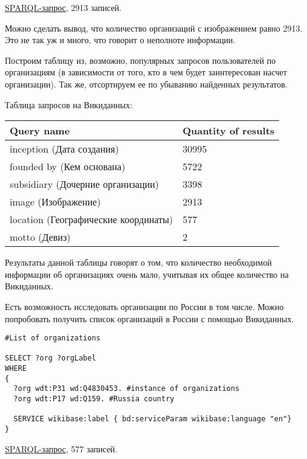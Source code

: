 \href{https://query.wikidata.org/#%23List%20of%20organisations%20%0A%0ASELECT%20%3Forg%20%3ForgLabel%20%3Fimage%0AWHERE%0A%7B%0A%20%20%3Forg%20wdt%3AP31%20wd%3AQ4830453.%20%23instance%20of%20orgs%0A%20%20%3Forg%20wdt%3AP18%20%3Fimage%0A%20%20%0A%0A%20%20SERVICE%20wikibase%3Alabel%20%7B%20bd%3AserviceParam%20wikibase%3Alanguage%20%22en%22%7D%0A%7D}{SPARQL-запрос}, 2913 записей.

Можно сделать вывод, что количество организаций с изображением равно 2913. Это не так уж и много, что говорит о неполноте информации.

Построим таблицу из, возможно, популярных запросов пользователей по организациям (в зависимости от того, кто в чем будет заинтересован насчет организации). Так же, отсортируем ее по убыванию найденных результатов.

Таблица запросов на Викиданных:\\
\begin{tabular}{|l|l|}
\hline
\textbf{Query name} & \textbf{Quantity of results} \\
\hline
inception (Дата создания) & 30995 \\	
\hline
founded by (Кем основана) & 5722 \\
\hline
subsidiary (Дочерние организации) & 3398 \\
\hline
image (Изображение) & 2913 \\
\hline
location (Географические координаты) & 577 \\
\hline
motto (Девиз) & 2 \\
\hline
\end{tabular}

Результаты данной таблицы говорят о том, что количество необходимой информации об организациях очень мало, учитывая их общее количество на Викиданных. 

Есть возможность исследовать организации по России в том числе.
Можно попробовать получить список организаций в России с помощью Викиданных.

\begin{lstlisting}[language=SPARQL]
#List of organizations 

SELECT ?org ?orgLabel
WHERE
{
  ?org wdt:P31 wd:Q4830453. #instance of organizations
  ?org wdt:P17 wd:Q159. #Russia country

  SERVICE wikibase:label { bd:serviceParam wikibase:language "en"}
}
\end{lstlisting}

\href{https://query.wikidata.org/#%23List%20of%20organisations%20%0A%0ASELECT%20%3Forg%20%3ForgLabel%20%3Flocation%0AWHERE%0A%7B%0A%20%20%3Forg%20wdt%3AP31%20wd%3AQ4830453.%20%23instance%20of%20orgs%0A%20%20%3Forg%20wdt%3AP17%20wd%3AQ159.%20%23Russia%20country%0A%0A%20%20SERVICE%20wikibase%3Alabel%20%7B%20bd%3AserviceParam%20wikibase%3Alanguage%20%22en%22%7D%0A%7D}{SPARQL-запрос}, 577 записей.

